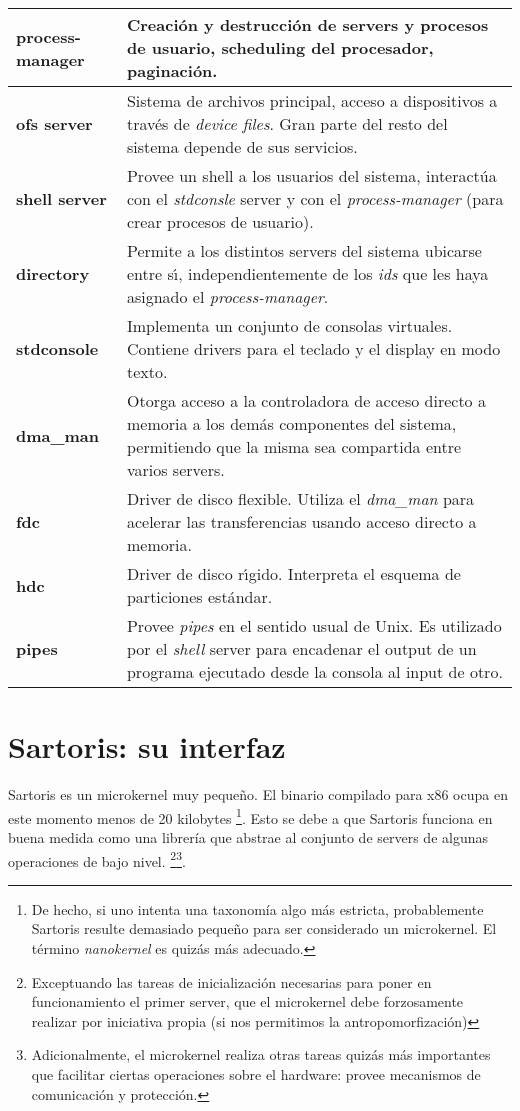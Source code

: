 \documentclass[11pt, letterpaper, twoside]{book}
\begin{document}
\begin{tabular}{|l|p{}|}
\hline
\textbf{process-manager} & Creaci\'on y destrucci\'on de servers y procesos de usuario, scheduling del procesador, paginaci\'on. \\
\hline
\textbf{ofs server} & Sistema de archivos principal, acceso a dispositivos a trav\'es de \emph{device files}. Gran parte del resto del sistema depende de sus servicios. \\
\hline
\textbf{shell server} & Provee un shell a los usuarios del sistema, interact\'ua con el \emph{stdconsle} server y con el \emph{process-manager} (para crear procesos de usuario). \\
\hline
\textbf{directory} & Permite a los distintos servers del sistema ubicarse entre s\'\i{}, independientemente de los \emph{ids} que les haya asignado el \emph{process-manager}. \\
\hline
\textbf{stdconsole} & Implementa un conjunto de consolas virtuales. Contiene drivers para el teclado y el display en modo texto. \\
\hline
\textbf{dma\_man} & Otorga acceso a la controladora de acceso directo a memoria a los dem\'as componentes del sistema, permitiendo que la misma sea compartida entre varios servers. \\
\hline
\textbf{fdc} & Driver de disco flexible. Utiliza el \emph{dma\_man} para acelerar las transferencias usando acceso directo a memoria.\\
\hline
\textbf{hdc} & Driver de disco r\'\i{}gido. Interpreta el esquema de particiones est\'andar.\\
\hline
\textbf{pipes} & Provee \emph{pipes} en el sentido usual de Unix. Es utilizado por el \emph{shell} server para encadenar el output de un programa ejecutado desde la consola al input de otro. \\
\hline
\end{tabular}



\chapter{Sartoris: su interfaz}

Sartoris es un microkernel muy peque\~no. El binario compilado para x86 ocupa en este momento menos de 20 kilobytes \footnote{De hecho, si uno intenta una taxonom\'ia algo m\'as estricta, probablemente Sartoris resulte demasiado peque\~no para ser considerado un microkernel. El t\'ermino \emph{nanokernel} es quiz\'as m\'as adecuado.}. Esto se debe a que Sartoris funciona en buena medida como una librer\'ia que abstrae al conjunto de servers de algunas operaciones de bajo nivel. \footnote{Exceptuando las tareas de inicializaci\'on necesarias para poner en funcionamiento el primer server, que el microkernel debe forzosamente realizar por iniciativa propia (si nos permitimos la antropomorfizaci\'on)}\footnote{Adicionalmente, el microkernel realiza otras tareas quiz\'as m\'as importantes que facilitar ciertas operaciones sobre el hardware: provee mecanismos de comunicaci\'on y protecci\'on.}.
\end{document}
